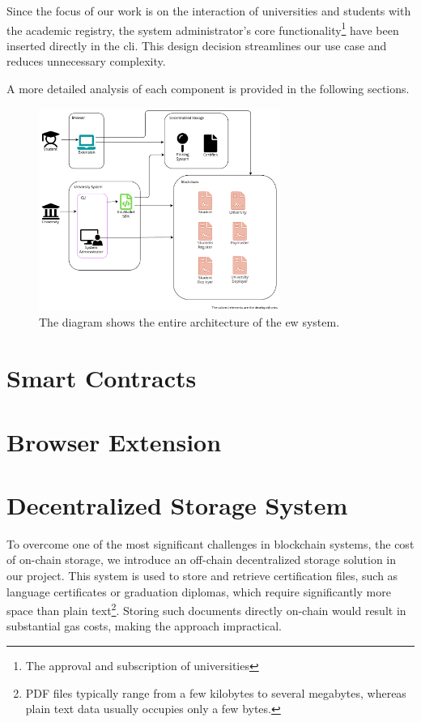 Since the focus of our work is on the interaction of universities and students with the academic registry, the system administrator's core functionality\footnote{The approval and subscription of universities} have been inserted directly in the \acrshort{cli}. This design decision streamlines our use case and reduces unnecessary complexity.

A more detailed analysis of each component is provided in the following sections.

\begin{figure}[htpb]
  \centering
  \includegraphics[width=0.7\textwidth]{figures/Architecture diagram complete.pdf}
  \caption[System architecture diagram]{The diagram shows the entire architecture of the \acrlong{ew} system.}
  \label{fig:fullArchDiag}
\end{figure}

\section{Smart Contracts}
\label{sec:smartContractsDesign}

\section{Browser Extension}
\label{sec:browserExtensionDesign}

\section{Decentralized Storage System}
\label{sec:decStorageDesgn}
To overcome one of the most significant challenges in blockchain systems, the cost of on-chain storage, we introduce an off-chain decentralized storage solution in our project. This system is used to store and retrieve certification files, such as language certificates or graduation diplomas, which require significantly more space than plain text\footnote{PDF files typically range from a few kilobytes to several megabytes, whereas plain text data usually occupies only a few bytes.}. Storing such documents directly on-chain would result in substantial gas costs, making the approach impractical. 

